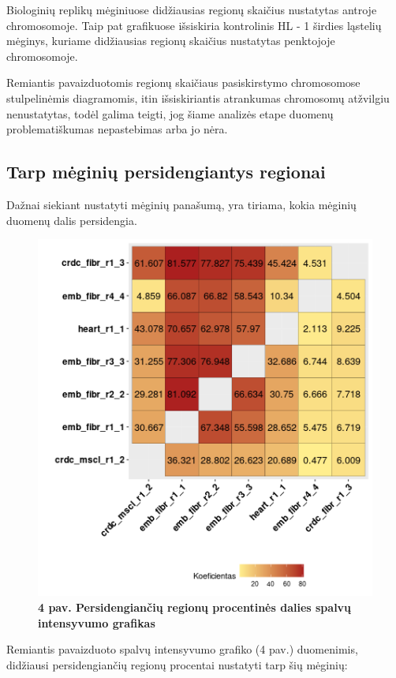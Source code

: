 \documentclass[12pt]{article}
\begin{document}
Biologinių replikų mėginiuose didžiausias regionų skaičius nustatytas antroje
chromosomoje. Taip pat grafikuose išsiskiria kontrolinis HL - 1 širdies
ląstelių mėginys, kuriame didžiausias regionų skaičius nustatytas penktojoje
chromosomoje.

Remiantis pavaizduotomis regionų skaičiaus pasiskirstymo chromosomose
stulpelinėmis diagramomis, itin išsiskiriantis atrankumas chromosomų atžvilgiu
nenustatytas, todėl galima teigti, jog šiame analizės etape duomenų
problematiškumas nepastebimas arba jo nėra.

\newpage


\subsection{Tarp mėginių persidengiantys regionai}
Dažnai siekiant nustatyti mėginių panašumą, yra tiriama, kokia mėginių duomenų
dalis persidengia.

\begin{figure}[htb]
    \begin{center}
        \includegraphics[width=0.7\linewidth]{../Figures/peak_overlaps.png}
        \caption*{\small\textbf{4 pav. Persidengiančių regionų procentinės
                                dalies spalvų intensyvumo grafikas}}
    \end{center}
\end{figure}

Remiantis pavaizduoto spalvų intensyvumo grafiko (4 pav.) duomenimis, didžiausi
persidengiančių regionų procentai nustatyti tarp šių mėginių:
\end{document}
